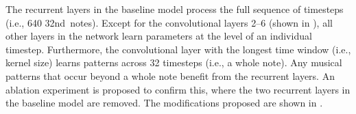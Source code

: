
The recurrent layers in the baseline model process the full
sequence of timesteps (i.e., 640 \gls{32nd}~notes). Except
for the convolutional layers 2--6 (shown in
), all other layers
in the network learn parameters at the level of an
individual timestep. Furthermore, the convolutional layer
with the longest time window (i.e., kernel size) learns
patterns across 32 timesteps (i.e., a \gls{whole} note). Any
musical patterns that occur beyond a \gls{whole} note
benefit from the recurrent layers. An ablation experiment is
proposed to confirm this, where the two recurrent layers in
the baseline model are removed. The modifications proposed
are shown in .

